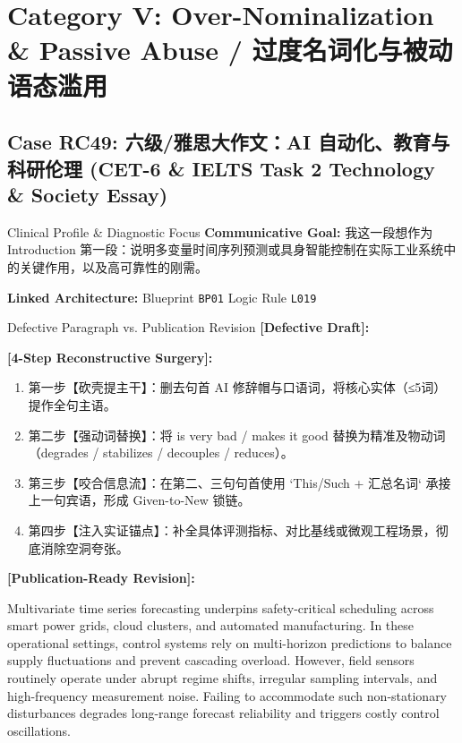 \section{Category V: Over-Nominalization \& Passive Abuse / 过度名词化与被动语态滥用}
\subsection{Case RC49: 六级/雅思大作文：AI 自动化、教育与科研伦理 (CET-6 \& IELTS Task 2 Technology \& Society Essay)}\label{case:RC49}
\begin{ConceptBox}{Clinical Profile \& Diagnostic Focus}
\textbf{Communicative Goal:} 我这一段想作为 Introduction 第一段：说明多变量时间序列预测或具身智能控制在实际工业系统中的关键作用，以及高可靠性的刚需。\par
\textbf{Linked Architecture:} Blueprint \texttt{BP01} \enspace\textbar\enspace Logic Rule \texttt{L019}
\end{ConceptBox}
\begin{ExampleBox}{Defective Paragraph vs. Publication Revision}
\textbf{\color{TargetHighlight}[Defective Draft]:}\par
{}\par\vspace{6pt}
\textbf{\color{AcadForest}[4-Step Reconstructive Surgery]:}
\begin{enumerate}[label=\textbf{\color{AcadNavy}Step \arabic*:}, leftmargin=2em]
  \item 第一步【砍壳提主干】：删去句首 AI 修辞帽与口语词，将核心实体（≤5词）提作全句主语。
  \item 第二步【强动词替换】：将 is very bad / makes it good 替换为精准及物动词（degrades / stabilizes / decouples / reduces）。
  \item 第三步【咬合信息流】：在第二、三句句首使用 `This/Such + 汇总名词` 承接上一句宾语，形成 Given-to-New 锁链。
  \item 第四步【注入实证锚点】：补全具体评测指标、对比基线或微观工程场景，彻底消除空洞夸张。
\end{enumerate}\vspace{4pt}
\textbf{\color{AcadNavy}[Publication-Ready Revision]:}\par
Multivariate time series forecasting underpins safety-critical scheduling across smart power grids, cloud clusters, and automated manufacturing. In these operational settings, control systems rely on multi-horizon predictions to balance supply fluctuations and prevent cascading overload. However, field sensors routinely operate under abrupt regime shifts, irregular sampling intervals, and high-frequency measurement noise. Failing to accommodate such non-stationary disturbances degrades long-range forecast reliability and triggers costly control oscillations.
\end{ExampleBox}
